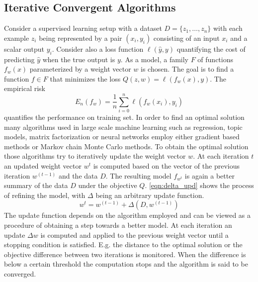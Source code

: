 \subsection{Iterative Convergent Algorithms}
\label{ss:ica}
Consider a supervised learning setup with a dataset $D = \{z_1,\ldots,z_n\}$ with each example $z_i$ being represented by a pair $(x_i,y_i)$ consisting of an input $x_i$ and a scalar output $y_i$.
Consider also a loss function $\ell(\hat{y},y)$ quantifying the cost of predicting $\hat{y}$ when the true output is $y$. As a model, a family $F$ of functions $f_w(x)$ parameterized by a weight vector $w$ is chosen.
The goal is to find a function $f \in F$ that minimizes the loss $Q(z, w) = \ell(f_w(x),y)$. The empirical risk
\begin{equation}
E_n(f_w) = \frac{1}{n}\sum_{i=0}^{n} \ell(f_w(x_i),y_i)
\label{eqn:emp_risk}
\end{equation}
quantifies the performance on training set.
In order to find an optimal solution many algorithms used in large scale machine learning such as regression, topic models, matrix factorization or neural networks employ either gradient based methods or Markov chain Monte Carlo methods.
To obtain the optimal solution those algorithms try to iteratively update the weight vector $w$. At each iteration $t$ an updated weight vector $w^{t}$ is computed based on the vector of the previous iteration $w^{(t-1)}$ and the data $D$. The resulting model $f_{w^{t}}$ is again a better summary of the data $D$ under the objective $Q$. \ref{eqn:delta_upd} shows the process of refining the model, with $\Delta$ being an arbitrary update function.
\begin{equation}
w^{t} = w^{(t-1)} + \Delta(D, w^{(t-1)})
\label{eqn:delta_upd}
\end{equation}
The update function depends on the algorithm employed and can be viewed as a procedure of obtaining a step towards a better model. At each iteration an update $\Delta w$ is computed and applied to the previous weight vector until a stopping condition is satisfied. E.g. the distance to the optimal solution or the objective difference between two iterations is monitored. When the difference is below a certain threshold the computation stops and the algorithm is said to be converged.


